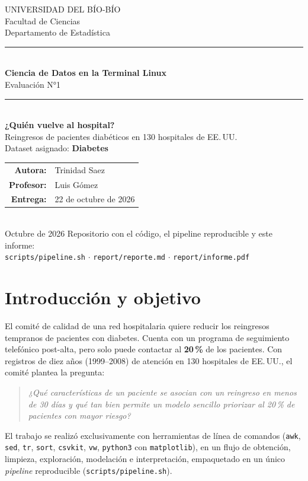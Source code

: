 \documentclass[11pt,a4paper]{article}
\newcommand{\cod}[1]{\texttt{#1}}
\begin{document}
\begin{titlepage}
\centering
{\large UNIVERSIDAD DEL BÍO-BÍO}\\[2pt]
{\normalsize Facultad de Ciencias}\\[2pt]
{\normalsize Departamento de Estadística}\\[1.6cm]
\rule{\textwidth}{0.6pt}\\[0.5cm]
{\Large\bfseries Ciencia de Datos en la Terminal Linux}\\[0.4cm]
{\large Evaluación N°1}\\[0.5cm]
\rule{\textwidth}{0.6pt}\\[1.6cm]
{\LARGE\bfseries ¿Quién vuelve al hospital?}\\[0.5cm]
{\Large Reingresos de pacientes diabéticos en 130 hospitales de EE.\,UU.}\\[1.2cm]
{\large Dataset asignado: \textbf{Diabetes}}\\[2.2cm]
\begin{tabular}{rl}
\textbf{Autora:}   & Trinidad Saez \\
\textbf{Profesor:} & Luis Gómez \\
\textbf{Entrega:}  & 22 de octubre de 2026 \\
\end{tabular}\\[2cm]
{\normalsize Octubre de 2026}
\vfill
{\small Repositorio con el código, el pipeline reproducible y este informe:\\ \texttt{scripts/pipeline.sh} $\cdot$ \texttt{report/reporte.md} $\cdot$ \texttt{report/informe.pdf}}
\end{titlepage}

\tableofcontents
\vspace{1.5em}
\listoffigures
\clearpage
\listoftables
\clearpage

\section{Introducción y objetivo}
El comité de calidad de una red hospitalaria quiere reducir los reingresos tempranos de pacientes con diabetes.
Cuenta con un programa de seguimiento telefónico post-alta, pero solo puede contactar al \textbf{20\,\%} de los pacientes.
Con registros de diez años (1999--2008) de atención en 130 hospitales de EE.\,UU., el comité plantea la pregunta:
\begin{quote}\itshape ¿Qué características de un paciente se asocian con un reingreso en menos de 30 días y qué tan bien permite un modelo sencillo priorizar al 20\,\% de pacientes con mayor riesgo?\end{quote}
El trabajo se realizó exclusivamente con herramientas de línea de comandos (\cod{awk}, \cod{sed}, \cod{tr}, \cod{sort}, \cod{csvkit}, \cod{vw}, \cod{python3} con \cod{matplotlib}), en un flujo de obtención, limpieza, exploración, modelación e interpretación, empaquetado en un único \emph{pipeline} reproducible (\cod{scripts/pipeline.sh}).
\end{document}
